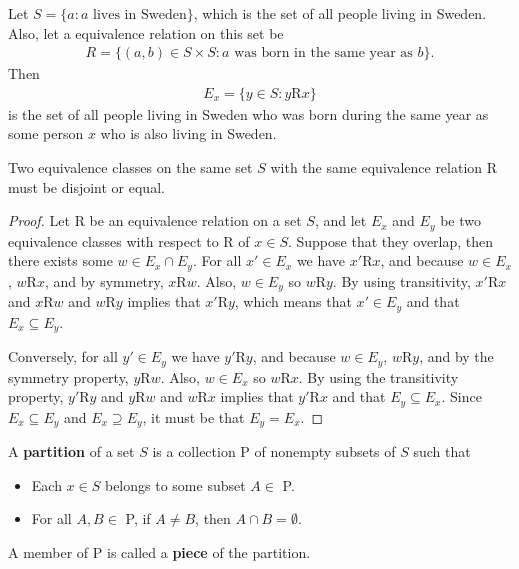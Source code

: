\begin{eg}
 	Let $S = \{a:a\text{ lives in Sweden}\}$, which is the set of all people living in Sweden. Also, let a equivalence relation on this set be
 	\begin{align*}
		R = \{(a,b)\in S\times S:a \text{ was born in the same year as } b\}.
	\end{align*}
	Then
 	\begin{align*}
		E_x = \{y\in S:y\text{R}x\}
	\end{align*}
	is the set of all people living in Sweden who was born during the same year as some person $x$ who is also living in Sweden.
 \end{eg}
 
\begin{theorem}
	Two equivalence classes on the same set $S$ with the same equivalence relation R must be disjoint or equal.
\end{theorem}

\begin{proof}
	Let R be an equivalence relation on a set $S$, and let $E_x$ and $E_y$ be two equivalence classes with respect to R of $x\in S$. Suppose that they overlap, then there exists some $w\in E_x \cap E_y$. For all $x'\in E_x$ we have $x'$R$x$, and because $w\in E_x$, $w$R$x$, and by symmetry, $x$R$w$. Also, $w\in E_y$ so $w$R$y$. By using transitivity, $x'$R$x$ and $x$R$w$ and $w$R$y$ implies that $x'$R$y$, which means that $x'\in E_y$ and that $E_x \subseteq E_y$. 
	
	Conversely, for all $y'\in E_y$ we have $y'$R$y$, and because $w\in E_y$, $w$R$y$, and by the symmetry property, $y$R$w$. Also, $w\in E_x$ so $w$R$x$. By using the transitivity property, $y'$R$y$ and $y$R$w$ and $w$R$x$ implies that $y'$R$x$ and that $E_y \subseteq E_x$. Since $E_x \subseteq E_y$ and $E_x \supseteq E_y$, it must be that $E_y = E_x$.
\end{proof}

\begin{definition}
	A \textbf{partition} of a set $S$ is a collection P of nonempty subsets of $S$ such that
	\begin{itemize}
		\item Each $x\in S$ belongs to some subset $A\in$ P.
		\item For all $A,B\in$ P, if $A\neq B$, then $A\cap B = \emptyset$.
	\end{itemize}
	A member of P is called a \textbf{piece} of the partition.
\end{definition}


